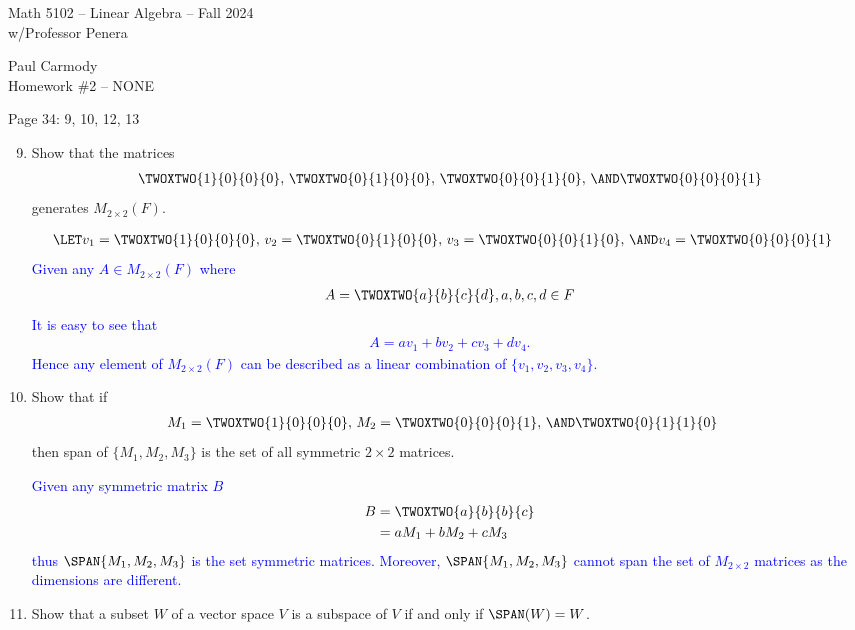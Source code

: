 \documentclass[10pt,a4paper]{report}
\newcommand{\CLASSNAME}{Math 5102 -- Linear Algebra }
\newcommand{\STUDENTNAME}{Paul Carmody}
\newcommand{\ASSIGNMENT}{Homework \#2 }
\newcommand{\DUEDATE}{NONE}
\newcommand{\SEMESTER}{Fall 2024}
\newcommand{\BLUE}[1]{\textcolor{blue}{#1}}
\begin{document}
\begin{center}
	\Large{\CLASSNAME -- \SEMESTER} \\
	\large{ w/Professor Penera}
\end{center}
\begin{center}
	\STUDENTNAME \\
	\ASSIGNMENT -- \DUEDATE\\
\end{center} 
Page 34: 9, 10, 12, 13
\begin{enumerate}
	
	\setcounter{enumi}{8}
	\item Show that the matrices
	\begin{align*}
		\TWOXTWO{1}{0}{0}{0}, \, \TWOXTWO{0}{1}{0}{0}, \, \TWOXTWO{0}{0}{1}{0}, \, \AND \TWOXTWO{0}{0}{0}{1}
	\end{align*}generates $M_{2 \times 2}(F)$.
	
	\BLUE{
	\begin{align*}
		\LET v_1 &= \TWOXTWO{1}{0}{0}{0}, \, v_2=\TWOXTWO{0}{1}{0}{0}, \, v_3=\TWOXTWO{0}{0}{1}{0}, \, \AND v_4=\TWOXTWO{0}{0}{0}{1}
	\end{align*}Given any $A \in M_{2\times 2}(F)$ where 
	\begin{align*}
		A = \TWOXTWO{a}{b}{c}{d}, a,b,c,d \in F
	\end{align*}It is easy to see that 
	\begin{align*}
		A = av_1+bv_2+cv_3+dv_4.
	\end{align*}Hence any element of $M_{2 \times 2}(F)$ can be described as a linear combination of $\{ v_1, v_2, v_3, v_4\}$.
	}
	
	\item Show that if 
	\begin{align*}
		M_1 &= \TWOXTWO{1}{0}{0}{0}, \, M_2 =  \TWOXTWO{0}{0}{0}{1}, \, \AND \TWOXTWO{0}{1}{1}{0}
	\end{align*}then span of $\{ M_1, M_2, M_3 \}$ is the set of all symmetric $2 \times 2$ matrices.
	
	\BLUE{Given any symmetric matrix $B$ 
	\begin{align*}
		B &= \TWOXTWO{a}{b}{b}{c} \\
		  &= aM_1 + bM_2 + c M_3
	\end{align*}thus $\SPAN\{ M_1, M_2, M_3 \}$ is the set symmetric matrices.  Moreover, $\SPAN\{ M_1, M_2, M_3 \}$ cannot span the set of $M_{2\times 2}$ matrices as the dimensions are different.
	}
		
	\setcounter{enumi}{11}
	\item Show that a subset $W$ of a vector space $V$ is a subspace of $V$ if and only if $\SPAN(W) = W$.
	

\end{enumerate}
\end{document}
